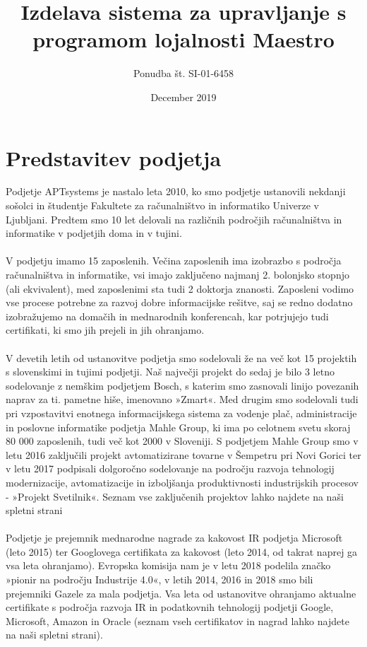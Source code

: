 \documentclass[12pt]{report}
\title{Izdelava sistema za upravljanje s programom lojalnosti Maestro}
\author{Ponudba št. SI-01-6458}
\date{December 2019}
\begin{document}
\maketitle

\chapter{Predstavitev podjetja}

Podjetje APTsystems je nastalo leta 2010, ko smo podjetje ustanovili nekdanji sošolci in študentje Fakultete za računalništvo in informatiko Univerze v Ljubljani. Predtem smo 10 let delovali na različnih področjih računalništva in informatike v podjetjih doma in v tujini.\\\\
V podjetju imamo 15 zaposlenih. Večina zaposlenih ima izobrazbo s področja računalništva in informatike, vsi imajo zaključeno najmanj 2. bolonjsko stopnjo (ali ekvivalent), med zaposlenimi sta tudi 2 doktorja znanosti. Zaposleni vodimo vse procese potrebne za razvoj dobre informacijske rešitve, saj se redno dodatno izobražujemo na domačih in mednarodnih konferencah, kar potrjujejo tudi certifikati, ki smo jih prejeli in jih ohranjamo.\\\\
V devetih letih od ustanovitve podjetja smo sodelovali že na več kot 15 projektih s slovenskimi in tujimi podjetji. Naš največji projekt do sedaj je bilo 3 letno sodelovanje z nemškim podjetjem Bosch, s katerim smo zasnovali linijo povezanih naprav za ti. pametne hiše, imenovano »Zmart«. Med drugim smo sodelovali tudi pri vzpostavitvi enotnega informacijskega sistema za vodenje plač, administracije in poslovne informatike podjetja Mahle Group, ki ima po celotnem svetu skoraj 80 000 zaposlenih, tudi več kot 2000 v Sloveniji. S podjetjem Mahle Group smo v letu 2016 zaključili projekt avtomatizirane tovarne v Šempetru pri Novi Gorici ter v letu 2017 podpisali dolgoročno sodelovanje na področju razvoja tehnologij modernizacije, avtomatizacije in izboljšanja produktivnosti industrijskih procesov - »Projekt Svetilnik«. Seznam vse zaključenih projektov lahko najdete na naši spletni strani\\\\
Podjetje je prejemnik mednarodne nagrade za kakovost IR podjetja Microsoft (leto 2015) ter Googlovega certifikata za kakovost (leto 2014, od takrat naprej ga vsa leta ohranjamo). Evropska komisija nam je v letu 2018 podelila značko »pionir na področju Industrije 4.0«, v letih 2014, 2016 in 2018 smo bili prejemniki Gazele za mala podjetja. Vsa leta od ustanovitve ohranjamo aktualne certifikate s področja razvoja IR in podatkovnih tehnologij podjetji Google, Microsoft, Amazon in Oracle (seznam vseh certifikatov in nagrad lahko najdete na naši spletni strani).\\\\
\end{document}
